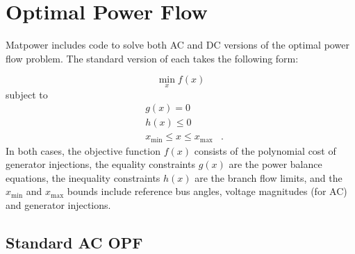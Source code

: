 \documentclass[12pt]{article}
\newcommand{\matpower}[0]{{\sc Matpower}}
\numberwithin{equation}{section}
\numberwithin{table}{section}
\numberwithin{figure}{section}
\begin{document}
\clearpage
\section{Optimal Power Flow}
\label{sec:opf}

\matpower{} includes code to solve both AC and DC versions of the optimal power flow problem. The standard version of each takes the following form:

\begin{equation}
\min_x f(x)
\label{eq:minfx}
\end{equation}
subject to
\begin{eqnarray}
& g(x) = 0 & \label{eq:gx_eq_0} \\
& h(x) \le 0 & \label{eq:hx_le_0} \\
& x_\mathrm{min} \le x \le x_\mathrm{max} & \label{eq:xlims}.
\end{eqnarray}
In both cases, the objective function $f(x)$ consists of the polynomial cost of generator injections, the equality constraints $g(x)$ are the power balance equations, the inequality constraints $h(x)$ are the branch flow limits, and the $x_\mathrm{min}$ and $x_\mathrm{max}$ bounds include reference bus angles, voltage magnitudes (for AC) and generator injections.

\subsection{Standard AC OPF}
\end{document}
